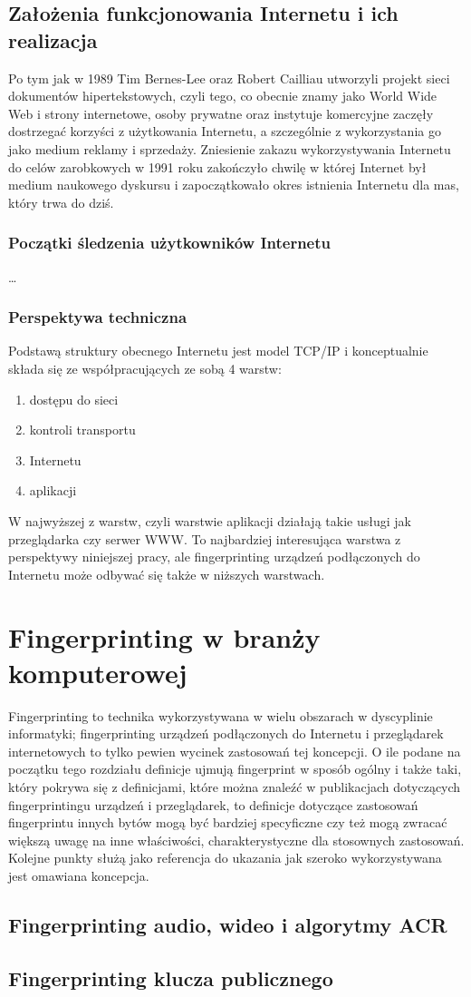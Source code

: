 \subsection{Założenia funkcjonowania Internetu i ich realizacja}
Po tym jak w 1989 Tim Bernes-Lee oraz Robert Cailliau utworzyli projekt sieci
dokumentów hipertekstowych, czyli tego, co obecnie znamy jako World Wide Web i
strony internetowe, osoby prywatne oraz instytuje komercyjne zaczęły dostrzegać
korzyści z użytkowania Internetu, a szczególnie z wykorzystania go jako medium
reklamy i sprzedaży. Zniesienie zakazu wykorzystywania Internetu do celów
zarobkowych w 1991 roku zakończyło chwilę w której Internet był medium naukowego
dyskursu i zapoczątkowało okres istnienia Internetu dla mas, który trwa do dziś.

\subsubsection{Początki śledzenia użytkowników Internetu}
\dots

\subsubsection{Perspektywa techniczna}
Podstawą struktury obecnego Internetu jest model TCP/IP i konceptualnie składa
się ze współpracujących ze sobą 4 warstw:
\begin{enumerate}
	\item dostępu do sieci
	\item kontroli transportu
	\item Internetu
	\item aplikacji
\end{enumerate}
W najwyższej z warstw, czyli warstwie aplikacji działają takie usługi jak
przeglądarka czy serwer WWW. To najbardziej interesująca warstwa z perspektywy
niniejszej pracy, ale fingerprinting urządzeń podłączonych do Internetu może
odbywać się także w niższych warstwach. %

\section{Fingerprinting w branży komputerowej}
Fingerprinting to technika wykorzystywana w wielu obszarach w dyscyplinie
informatyki; fingerprinting urządzeń podłączonych do Internetu i przeglądarek
internetowych to tylko pewien wycinek zastosowań tej koncepcji. O ile podane na
początku tego rozdziału definicje ujmują fingerprint w sposób ogólny i także
taki, który pokrywa się z definicjami, które można znaleźć w publikacjach
dotyczących fingerprintingu urządzeń i przeglądarek, to definicje dotyczące
zastosowań fingerprintu innych bytów mogą być bardziej specyficzne czy też mogą
zwracać większą uwagę na inne właściwości, charakterystyczne dla stosownych
zastosowań. Kolejne punkty służą jako referencja do ukazania jak szeroko
wykorzystywana jest omawiana koncepcja.

\subsection{Fingerprinting audio, wideo i algorytmy ACR}

\subsection{Fingerprinting klucza publicznego}
